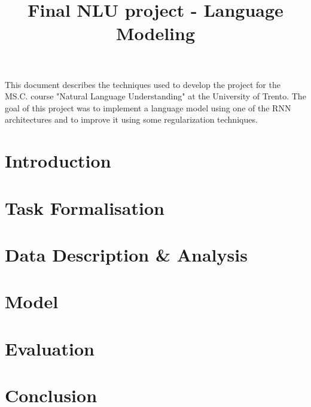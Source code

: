 \documentclass[a4paper]{article}
\title{Final NLU project - Language Modeling}
\begin{document}
\maketitle

This document describes the techniques used to develop the project for the MS.C. course "Natural Language Understanding" at the University of Trento. The goal of this project was to implement a language model using one of the RNN architectures and to improve it using some regularization techniques.


\section{Introduction}


\section{Task Formalisation}


\section{Data Description \& Analysis}


\section{Model}


\section{Evaluation}


\section{Conclusion}






\end{document}
